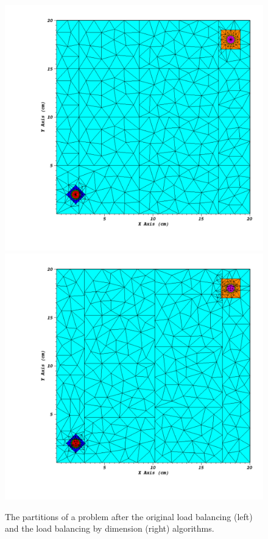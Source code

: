 \documentclass[letterpaper]{mandc2019}
\begin{document}
{\begin{figure}[!htb]
\centering
\includegraphics[scale=0.45,trim={0.95in 0.64in 0.35in 0.44in},clip]{Figures/og_lb_example.pdf}
\includegraphics[scale=0.45,trim={0.95in 0.64in 0.35in 0.44in},clip]{Figures/lbd_example.pdf}
\caption{The partitions of a problem after the original load balancing (left) and the load balancing by dimension (right) algorithms.}
\label{alg_illustration}
\end{figure}

}
\end{document}
